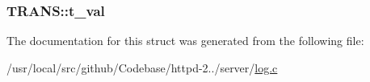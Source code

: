 \subsubsection[{\texorpdfstring{t\+\_\+val}{t_val}}]{ T\+R\+A\+N\+S\+::t\+\_\+val}\hypertarget{structTRANS_abda2aa4fdb9e09768d979b45d17ae42d}{}\label{structTRANS_abda2aa4fdb9e09768d979b45d17ae42d}


The documentation for this struct was generated from the following file\+:\begin{DoxyCompactItemize}
\item 
/usr/local/src/github/\+Codebase/httpd-\/2../server/\hyperlink{log_8c}{log.\+c}\end{DoxyCompactItemize}

